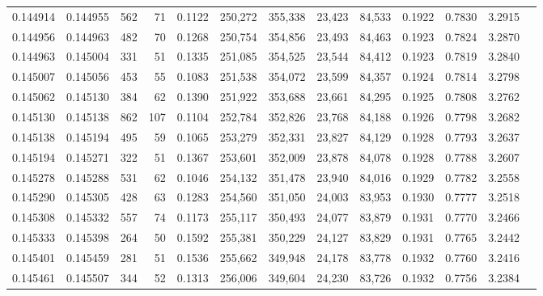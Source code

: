 \begin{tabular}{rrrrrrrrrrrrr}
0.144914 & 0.144955 &   562 &  71 &                                     0.1122 & 250,272 & 355,338 &  23,423 &  84,533 & 0.1922 & 0.7830 & 3.2915 \\
0.144956 & 0.144963 &   482 &  70 &                                     0.1268 & 250,754 & 354,856 &  23,493 &  84,463 & 0.1923 & 0.7824 & 3.2870 \\
0.144963 & 0.145004 &   331 &  51 &                                     0.1335 & 251,085 & 354,525 &  23,544 &  84,412 & 0.1923 & 0.7819 & 3.2840 \\
0.145007 & 0.145056 &   453 &  55 &                                     0.1083 & 251,538 & 354,072 &  23,599 &  84,357 & 0.1924 & 0.7814 & 3.2798 \\
0.145062 & 0.145130 &   384 &  62 &                                     0.1390 & 251,922 & 353,688 &  23,661 &  84,295 & 0.1925 & 0.7808 & 3.2762 \\
0.145130 & 0.145138 &   862 & 107 &                                     0.1104 & 252,784 & 352,826 &  23,768 &  84,188 & 0.1926 & 0.7798 & 3.2682 \\
0.145138 & 0.145194 &   495 &  59 &                                     0.1065 & 253,279 & 352,331 &  23,827 &  84,129 & 0.1928 & 0.7793 & 3.2637 \\
0.145194 & 0.145271 &   322 &  51 &                                     0.1367 & 253,601 & 352,009 &  23,878 &  84,078 & 0.1928 & 0.7788 & 3.2607 \\
0.145278 & 0.145288 &   531 &  62 &                                     0.1046 & 254,132 & 351,478 &  23,940 &  84,016 & 0.1929 & 0.7782 & 3.2558 \\
0.145290 & 0.145305 &   428 &  63 &                                     0.1283 & 254,560 & 351,050 &  24,003 &  83,953 & 0.1930 & 0.7777 & 3.2518 \\
0.145308 & 0.145332 &   557 &  74 &                                     0.1173 & 255,117 & 350,493 &  24,077 &  83,879 & 0.1931 & 0.7770 & 3.2466 \\
0.145333 & 0.145398 &   264 &  50 &                                     0.1592 & 255,381 & 350,229 &  24,127 &  83,829 & 0.1931 & 0.7765 & 3.2442 \\
0.145401 & 0.145459 &   281 &  51 &                                     0.1536 & 255,662 & 349,948 &  24,178 &  83,778 & 0.1932 & 0.7760 & 3.2416 \\
0.145461 & 0.145507 &   344 &  52 &                                     0.1313 & 256,006 & 349,604 &  24,230 &  83,726 & 0.1932 & 0.7756 & 3.2384 \\

\end{tabular}
